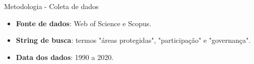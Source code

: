 \begin{frame}{Metodologia - Coleta de dados}
\begin{itemize}
    \item \textbf{Fonte de dados}: Web of Science e Scopus.
    \item \textbf{String de busca}: termos "áreas protegidas", "participação" e "governança".
    \item \textbf{Data dos dados}: 1990 a 2020.
\end{itemize}
\end{frame}